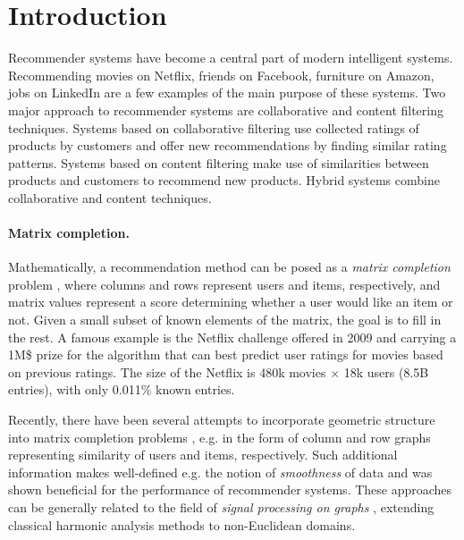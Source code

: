 \documentclass{article}
\begin{document}
\section{Introduction}


Recommender systems have become a central part of modern intelligent systems. Recommending movies on Netflix, friends on Facebook, furniture on Amazon, jobs on LinkedIn are a few examples of the main purpose of these systems. 
Two major approach to recommender systems are collaborative \cite{pro:BreeseHeckermanKadie98CollFilt} and content \cite{art:PazzaniBillsus07ContFilt} filtering techniques. Systems based on collaborative filtering use collected ratings of products by customers and offer new recommendations by finding similar rating patterns. Systems based on content filtering make use of similarities between products and customers to recommend new products. Hybrid systems combine collaborative and content techniques. 



\paragraph*{Matrix completion.}
Mathematically, a recommendation method can be posed as a {\em matrix completion} problem \cite{candes2012exact}, where columns and rows represent users and items, respectively, and matrix values represent a score determining whether a user would like an item or not. Given a small subset of known elements of the matrix, the goal is to fill in the rest. 
A famous example is the Netflix challenge \cite{art:KorenBellVolinsky09MatFac} offered in 2009 and carrying a 1M\$ prize for the algorithm that can best predict user ratings for movies based on previous ratings. The size of the Netflix is 480k movies $\times$ 18k users (8.5B entries), with only 0.011\% known entries. 


Recently, there have been several attempts to incorporate geometric structure into matrix completion problems \cite{art:MaZhouLiuLyuKing11RecomSys,kalofolias2014matrix,rao2015collaborative,kuang2016harmonic}, e.g. in the form of column and row graphs representing similarity of users and items, respectively. Such additional information makes well-defined e.g. the notion of {\em smoothness} of data and was shown beneficial for the performance of recommender systems. 
These approaches can be generally related to the field of {\em signal processing on graphs} \cite{shuman2013emerging}, extending classical harmonic analysis methods to non-Euclidean domains. 
\end{document}
